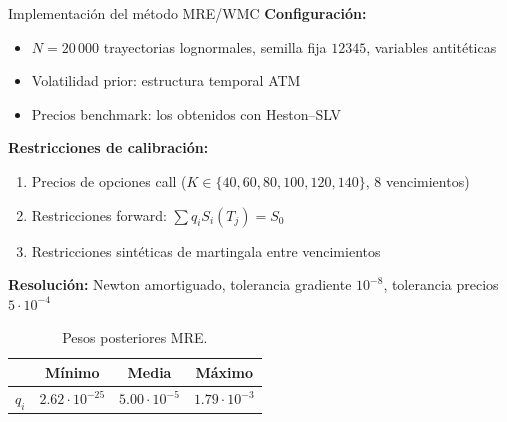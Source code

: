 \documentclass[8pt]{beamer}
\begin{document}
\begin{frame}{Implementación del método MRE/WMC}
    \textbf{Configuración:}
    \begin{itemize}
        \item $N = 20\,000$ trayectorias lognormales, semilla fija $12345$, variables antitéticas
        \item Volatilidad prior: estructura temporal ATM
        \item Precios benchmark: los obtenidos con Heston--SLV
    \end{itemize}
    \pause
    
    \textbf{Restricciones de calibración:}
    \begin{enumerate}
        \item Precios de opciones call ($K \in \{40,60,80,100,120,140\}$, 8 vencimientos)
        \item Restricciones forward: $\sum q_i S_i(T_j) = S_0$
        \item Restricciones sintéticas de martingala entre vencimientos
    \end{enumerate}
    \pause
    
    \textbf{Resolución:} Newton amortiguado, tolerancia gradiente $10^{-8}$, tolerancia precios $5\cdot 10^{-4}$
    \pause
    
    \begin{table}
    \centering
    \begin{tabular}{c|ccc}
    \hline
     & Mínimo & Media & Máximo \\
    \hline
    $q_i$ & $2.62\cdot 10^{-25}$ & $5.00\cdot 10^{-5}$ & $1.79\cdot 10^{-3}$ \\
    \hline
    \end{tabular}
    \caption{Pesos posteriores MRE.}
    \end{table}
\end{frame}
\end{document}

